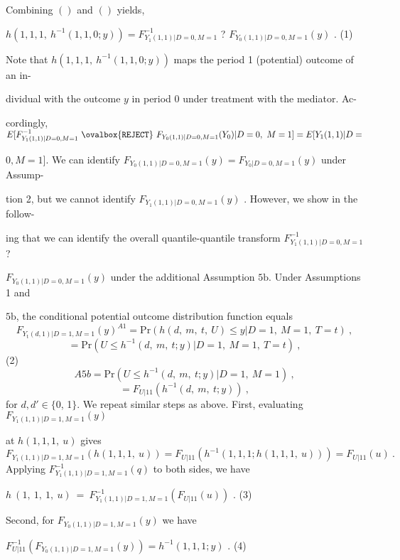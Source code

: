 \documentclass[a4paper,12pt]{article}
\begin{document}
Combining $()$ and $()$ yields,
\begin{center}
$h(1,1,1,\ h^{-1}(1,1,0;y))=F_{Y_{1}(1,1)|D=0,M=1}^{-1}$ ? $F_{Y_{0}(1,1)|D=0,M=1}(y)$ .   (1)
\end{center}
Note that $h(1,1,1,\ h^{-1}(1,1,0;y))$ maps the period 1 (potential) outcome of an in-

dividual with the outcome $y$ in period $0$ under treatment with the mediator. Ac-

cordingly, $E[F_{Y_{1}(1,1)|D=0,M=1}^{-1}\ \ovalbox{\tt\small REJECT}\ F_{Y_{0}(1,1)|D=0,M=1}(Y_{0})|D=0,\ M=1] =E[Y_{1}(1,1)|D=$

$0, M = 1]$. We can identify $F_{Y_{0}(1,1)|D=0,M=1}(y) = F_{Y_{0}|D=0,M=1}(y)$ under Assump-

tion 2, but we cannot identify $F_{Y_{1}(1,1)|D=0,M=1}(y)$ . However, we show in the follow-

ing that we can identify the overall quantile-quantile transform $F_{Y_{1}(1,1)|D=0,M=1}^{-1}$ ?

$F_{Y_{0}(1,1)|D=0,M=1}(y)$ under the additional Assumption $5\mathrm{b}$. Under Assumptions 1 and

$5\mathrm{b}$, the conditional potential outcome distribution function equals
$$
F_{Y_{\mathrm{t}}(d,1)|D=1,M=1}(y)^{A1}=\mathrm{P}\mathrm{r}(h(d,\ m,\ t,\ U)\leq y|D=1,\ M=1,\ T=t)\ ,
$$
$$
=\mathrm{P}\mathrm{r}(U\leq h^{-1}(d,\ m,\ t;y)|D=1,\ M=1,\ T=t)\ ,
$$
(2)
$$
A5b=\mathrm{P}\mathrm{r}(U\leq h^{-1}(d,\ m,\ t;y)|D=1,\ M=1)\ ,
$$
$$
=F_{U|11}(h^{-1}(d,\ m,\ t;y))\ ,
$$
for $d, d'\in\{0$, 1$\}$. We repeat similar steps as above. First, evaluating $F_{Y_{1}(1,1)|D=1,M=1}(y)$

at $h(1,1,1,\ u)$ gives
$$
F_{Y_{1}(1,1)|D=1,M=1}(h(1,1,1,\ u))=F_{U|11}(h^{-1}(1,1,1;h(1,1,1,\ u)))=F_{U|11}(u)\ .
$$
Applying $F_{Y_{1}(1,1)|D=1,M=1}^{-1}(q)$ to both sides, we have
\begin{center}
$h\ (1,\ 1,\ 1,\ u)\ =\ F_{Y_{1}(1,1)|D=1,M=1}^{-1}(F_{U|11}(u))$ .   (3)
\end{center}
Second, for $F_{Y_{0}(1,1)|D=1,M=1}(y)$ we have
\begin{center}
$F_{U|11}^{-1}(F_{Y_{0}(1,1)|D=1,M=1}(y))=h^{-1}(1,1,1;y)$ .   (4)
\end{center}
\end{document}
